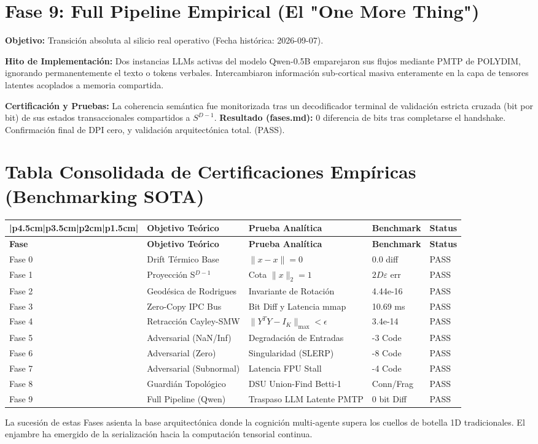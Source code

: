 \section{Fase 9: Full Pipeline Empirical (El "One More Thing")}

\textbf{Objetivo:} Transición absoluta al silicio real operativo (Fecha histórica: 2026-09-07).

\textbf{Hito de Implementación:} Dos instancias LLMs activas del modelo Qwen-0.5B emparejaron sus flujos mediante PMTP de POLYDIM, ignorando permanentemente el texto o tokens verbales. Intercambiaron información sub-cortical masiva enteramente en la capa de tensores latentes acoplados a memoria compartida.

\textbf{Certificación y Pruebas:} La coherencia semántica fue monitorizada tras un decodificador terminal de validación estricta cruzada (bit por bit) de sus estados transaccionales compartidos a $S^{D-1}$.
\textbf{Resultado (fases.md):} 0 diferencia de bits tras completarse el handshake. Confirmación final de DPI cero, y validación arquitectónica total. (PASS).

\section{Tabla Consolidada de Certificaciones Empíricas (Benchmarking SOTA)}

\begin{tabular}{llll}|p{4.5cm}|p{3.5cm}|p{2cm}|p{1.5cm}|}
\hline
\textbf{Fase} & \textbf{Objetivo Teórico} & \textbf{Prueba Analítica} & \textbf{Benchmark} & \textbf{Status} \\ \hline
\endfirsthead
\hline
\textbf{Fase} & \textbf{Objetivo Teórico} & \textbf{Prueba Analítica} & \textbf{Benchmark} & \textbf{Status} \\ \hline
\endhead
Fase 0 & Drift Térmico Base & $\lVert x - x \rVert = 0$ & 0.0 diff & PASS \\ \hline
Fase 1 & Proyección S$^{D-1}$ & Cota $\lVert x \rVert_2 = 1$ & $2D \varepsilon$ err & PASS \\ \hline
Fase 2 & Geodésica de Rodrigues & Invariante de Rotación & 4.44e-16 & PASS \\ \hline
Fase 3 & Zero-Copy IPC Bus & Bit Diff y Latencia mmap & 10.69 ms & PASS \\ \hline
Fase 4 & Retracción Cayley-SMW & $\lVert Y^T Y - I_K \rVert_{\max} < \epsilon$ & 3.4e-14 & PASS \\ \hline
Fase 5 & Adversarial (NaN/Inf) & Degradación de Entradas & -3 Code & PASS \\ \hline
Fase 6 & Adversarial (Zero) & Singularidad (SLERP) & -8 Code & PASS \\ \hline
Fase 7 & Adversarial (Subnormal) & Latencia FPU Stall & -4 Code & PASS \\ \hline
Fase 8 & Guardián Topológico & DSU Union-Find Betti-1 & Conn/Frag & PASS \\ \hline
Fase 9 & Full Pipeline (Qwen) & Traspaso LLM Latente PMTP & 0 bit Diff & PASS \\ \hline

\end{tabular}

La sucesión de estas Fases asienta la base arquitectónica donde la cognición multi-agente supera los cuellos de botella 1D tradicionales. El enjambre ha emergido de la serialización hacia la computación tensorial continua.
